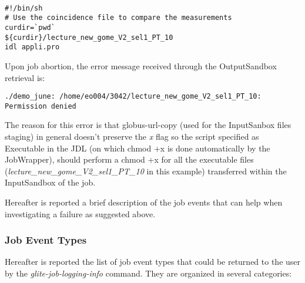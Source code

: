 \smallskip
\begin{verbatim}

#!/bin/sh
# Use the coincidence file to compare the measurements
curdir=`pwd`
${curdir}/lecture_new_gome_V2_sel1_PT_10
idl appli.pro

\end{verbatim}
\smallskip


Upon job abortion, the error message received through the OutputSandbox retrieval is:

\smallskip
{\scriptsize{\verb!./demo_june: /home/eo004/3042/lecture_new_gome_V2_sel1_PT_10: Permission denied!}}
\smallskip

The reason for this error is that globus-url-copy (used for the InputSanbox files staging) in general doesn't preserve 
the \emph{x} flag so the script specified as Executable in the JDL (on which chmod +x is done automatically by the 
JobWrapper), should perform a chmod +x for all the executable files (\textit{lecture\_new\_gome\_V2\_sel1\_PT\_10} in 
this example) transferred within the InputSandbox of the job.


Hereafter is reported a brief description of the job events that can help when investigating a failure as suggested above.


\subsubsection{Job Event Types}

Hereafter is reported the list of job event types that could be returned to the user by the 
\textit{glite-job-logging-info} command. They are organized in several categories:

\smallskip

